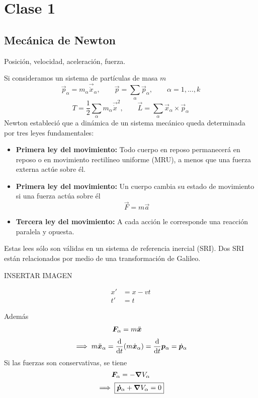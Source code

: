 \section{Clase 1}
\subsection{Mecánica de Newton}
Posición, velocidad, aceleración, fuerza.

Si consideramos un sistema de partículas de masa $m$
\begin{equation}
  \vec{p}_\alpha =m_\alpha \vec{\dot{x}}_\alpha,\qquad \vec{p}=\sum_\alpha \vec{p}_\alpha,\qquad \alpha=1,...,k
\end{equation}
\begin{equation}
  T=\frac{1}{2}\sum_\alpha m_\alpha \vec{\dot{x}}^2,\qquad \vec{L}=\sum_\alpha \vec{x}_\alpha\times \vec{p}_\alpha
\end{equation}
Newton estableció que a dinámica de un sistema mecánico queda	determinada por tres leyes fundamentales:
\begin{itemize}
	\item \textbf{Primera ley del movimiento:} Todo cuerpo en reposo permanecerá en reposo o en movimiento rectilíneo uniforme (MRU), a menos que una fuerza externa actúe sobre él.
	\item \textbf{Primera ley del movimiento:} Un cuerpo cambia su estado de movimiento si una fuerza actúa sobre él
	\begin{equation}
  \vec{F}=m\vec{a}
\end{equation}

\item \textbf{Tercera ley del movimiento:} A cada acción le corresponde una reacción paralela y opuesta.
\end{itemize}

Estas lees sólo son válidas en un sistema de referencia inercial (SRI). Dos SRI están relacionados por medio de una transformación de Galileo.

INSERTAR IMAGEN

\begin{align}
  x'&=x-vt\\
  t'&=t
\end{align}

Además
\begin{align}
  \vb*{F}_\alpha &=m\ddot{\vb*{x}}
\end{align}
\begin{equation}
	\implies m\ddot{\vb*{x}}_\alpha =\dv{t}(m\dot{\vb*{x}}_\alpha )=\dv{t}\vb*{p}_\alpha =\dot{\vb*{p}}_\alpha 
\end{equation}
Si las fuerzas son conservativas, se tiene
\begin{equation}
  \vb*{F}_\alpha =-\vb*{\nabla} V_\alpha 
\end{equation}
\begin{equation}
  \implies \boxed{\vb*{\dot{p}}_\alpha +\vb*{\nabla}V_\alpha =0}
\end{equation}

